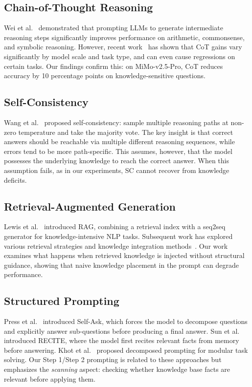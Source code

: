 \subsection{Chain-of-Thought Reasoning}
Wei et al.~\cite{wei2022cot} demonstrated that prompting LLMs to generate intermediate reasoning steps significantly improves performance on arithmetic, commonsense, and symbolic reasoning. However, recent work~\cite{ye2024revisting} has shown that CoT gains vary significantly by model scale and task type, and can even cause regressions on certain tasks. Our findings confirm this: on MiMo-v2.5-Pro, CoT reduces accuracy by 10 percentage points on knowledge-sensitive questions.

\subsection{Self-Consistency}
Wang et al.~\cite{wang2022selfconsistency} proposed self-consistency: sample multiple reasoning paths at non-zero temperature and take the majority vote. The key insight is that correct answers should be reachable via multiple different reasoning sequences, while errors tend to be more path-specific. This assumes, however, that the model possesses the underlying knowledge to reach the correct answer. When this assumption fails, as in our experiments, SC cannot recover from knowledge deficits.

\subsection{Retrieval-Augmented Generation}
Lewis et al.~\cite{lewis2020rag} introduced RAG, combining a retrieval index with a seq2seq generator for knowledge-intensive NLP tasks. Subsequent work has explored various retrieval strategies and knowledge integration methods~\cite{asai2023selfrag}. Our work examines what happens when retrieved knowledge is injected without structural guidance, showing that naive knowledge placement in the prompt can degrade performance.

\subsection{Structured Prompting}
Press et al.~\cite{press2022selfask} introduced Self-Ask, which forces the model to decompose questions and explicitly answer sub-questions before producing a final answer. Sun et al.~\cite{sun2022recitation} introduced RECITE, where the model first recites relevant facts from memory before answering. Khot et al.~\cite{khot2023decomposed} proposed decomposed prompting for modular task solving. Our Step 1/Step 2 prompting is related to these approaches but emphasizes the \emph{scanning} aspect: checking whether knowledge base facts are relevant before applying them.

